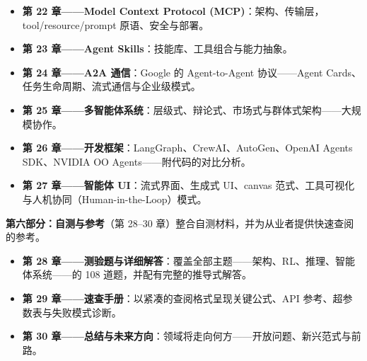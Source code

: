\documentclass[11pt,a4paper,openany]{book}
\begin{document}
\begin{itemize}
  \item \textbf{第 22 章——Model Context Protocol (MCP)}：架构、传输层，tool/resource/prompt 原语、安全与部署。
  \item \textbf{第 23 章——Agent Skills}：技能库、工具组合与能力抽象。
  \item \textbf{第 24 章——A2A 通信}：Google 的 Agent-to-Agent 协议——Agent Cards、任务生命周期、流式通信与企业级模式。
  \item \textbf{第 25 章——多智能体系统}：层级式、辩论式、市场式与群体式架构——大规模协作。
  \item \textbf{第 26 章——开发框架}：LangGraph、CrewAI、AutoGen、OpenAI Agents SDK、NVIDIA OO Agents——附代码的对比分析。
  \item \textbf{第 27 章——智能体 UI}：流式界面、生成式 UI、canvas 范式、工具可视化与人机协同（Human-in-the-Loop）模式。
\end{itemize}

\textbf{第六部分：自测与参考}（第 28--30 章）整合自测材料，并为从业者提供快速查阅的参考。

\begin{itemize}
  \item \textbf{第 28 章——测验题与详细解答}：覆盖全部主题——架构、RL、推理、智能体系统——的 108 道题，并配有完整的推导式解答。
  \item \textbf{第 29 章——速查手册}：以紧凑的查阅格式呈现关键公式、API 参考、超参数表与失败模式诊断。
  \item \textbf{第 30 章——总结与未来方向}：领域将走向何方——开放问题、新兴范式与前路。
\end{itemize}
\end{document}
